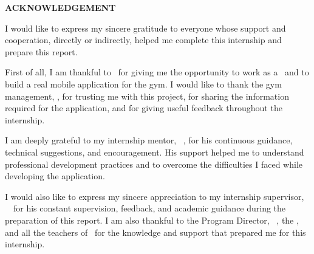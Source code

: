 %
%
\clearpage

{\centering
{\bfseries\fontsize{16}{19.3}\selectfont ACKNOWLEDGEMENT\par}
\vspace{15.8pt}

}

I would like to express my sincere gratitude to everyone whose support and cooperation, directly or indirectly, helped me complete this internship and prepare this report.
\vspace{6pt}

First of all, I am thankful to \CompanyName\ for giving me the opportunity to work as a \InternPosition\ and to build a real mobile application for the gym. I would like to thank the gym management, \GymManagementName, for trusting me with this project, for sharing the information required for the application, and for giving useful feedback throughout the internship.
\vspace{6pt}

I am deeply grateful to my internship mentor, \CompanyMentorTitle\ \CompanyMentor, for his continuous guidance, technical suggestions, and encouragement. His support helped me to understand professional development practices and to overcome the difficulties I faced while developing the application.
\vspace{6pt}

I would also like to express my sincere appreciation to my internship supervisor, \SupervisorTitle\ \SupervisorName\ for his constant supervision, feedback, and academic guidance during the preparation of this report. I am also thankful to the Program Director, \SupervisorTitle\ \HeadOfDepartment, the \DepartmentFullName, and all the teachers of \CampusFullName\ for the knowledge and support that prepared me for this internship.
\vspace{6pt}


